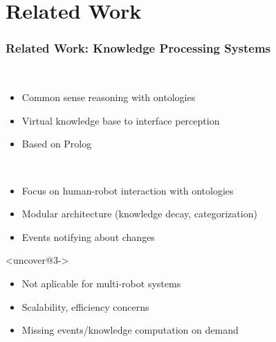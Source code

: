 \section{Related Work}

\begin{frame}
  \frametitle{Related Work: Knowledge Processing Systems}
  \begin{description}[]
  \item[KnowRob]<uncover@1-> \hfill \\
    \begin{itemize}
    \item Common sense reasoning with ontologies
    \item Virtual knowledge base to interface perception
    \item Based on Prolog
    \end{itemize}
  \smallskip
  \item[OpenRobots Ontology (ORO)]<uncover@2-> \hfill \\
    \begin{itemize}
    \item Focus on human-robot interaction with ontologies
    \item Modular architecture (knowledge decay, categorization)
    \item Events notifying about changes
    \end{itemize}
  \end{description}
  \begin{block}{}<uncover@3->
  \begin{itemize}
  \item Not aplicable for multi-robot systems
  \item Scalability, efficiency concerns
  \item Missing events/knowledge computation on demand
  \end{itemize}
  \end{block}
\end{frame}


